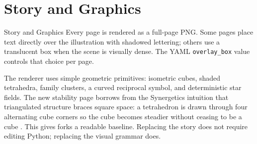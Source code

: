 \documentclass[
  ignorenonframetext,
]{beamer}
\author{\texorpdfstring{}{}}
\date{}
\begin{document}
\section{Story and Graphics}\label{story-and-graphics}

\begin{frame}{Story and Graphics}
Every page is rendered as a full-page PNG. Some pages place text
directly over the illustration with shadowed lettering; others use a
translucent box when the scene is visually dense. The YAML
\texttt{overlay\_box} value controls that choice per page.

The renderer uses simple geometric primitives: isometric cubes, shaded
tetrahedra, family clusters, a curved reciprocal symbol, and
deterministic star fields. The new stability page borrows from the
Synergetics intuition that triangulated structure braces square space: a
tetrahedron is drawn through four alternating cube corners so the cube
becomes steadier without ceasing to be a cube
. This gives forks a readable baseline.
Replacing the story does not require editing Python; replacing the
visual grammar does.
\end{frame}
\end{document}
